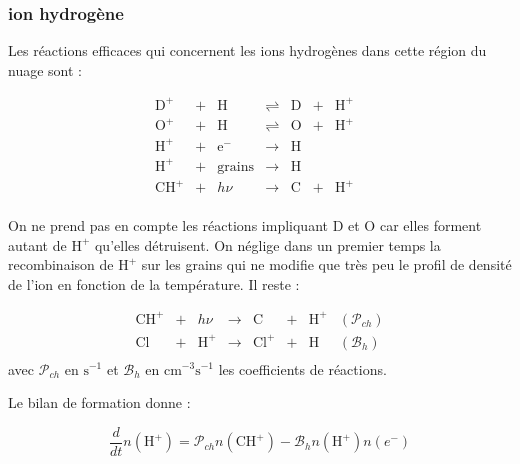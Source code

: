 \subsubsection{ion hydrogène}

Les réactions efficaces qui concernent les ions hydrogènes dans cette région du nuage sont : 

\begin{equation}\label{eq:sysH}
    \begin{array}{lllllllr}
        \mathrm{D}^+ & + &\mathrm{H}   & \rightleftharpoons &\mathrm{D}  & + & \mathrm{H}^+ &   \\
        \mathrm{O}^+ & + &\mathrm{H}   & \rightleftharpoons &\mathrm{O}  & + & \mathrm{H}^+ &   \\
        \mathrm{H}^+  & + & \mathrm{e}^-  & \rightarrow &\mathrm{H}   &   &  &  \\
        \mathrm{H}^+  & + & \mathrm{grains}  & \rightarrow &\mathrm{H}   &   &  &  \\
        \mathrm{CH}^+ & + & h\nu   & \rightarrow &\mathrm{C}  & + & \mathrm{H}^+ &  \\
    \end{array}
\end{equation}

On ne prend pas en compte les réactions impliquant $\mathrm{D}$ et $\mathrm{O}$ car elles forment autant de $\mathrm{H}^+$ qu'elles détruisent. On néglige dans un premier temps la recombinaison de $\mathrm{H}^+$ sur les grains qui ne modifie que très peu le profil de densité de l'ion en fonction de la température. Il reste :

\begin{equation}
    \begin{array}{lllllllr}
        \mathrm{CH}^+ & + & h\nu   & \rightarrow &\mathrm{C}  & + & \mathrm{H}^+ & (\mathcal{P}_{ch}) \\
        \mathrm{Cl}  & + & \mathrm{H}^+  & \rightarrow & \mathrm{Cl}^+ & + &\mathrm{H}  & (\mathcal{B}_h) \\
    \end{array}
\end{equation}
avec $\mathcal{P}_{ch}$ en $\mathrm{s}^{-1}$ et $\mathcal{B}_h$ en $\mathrm{cm}^{-3}\mathrm{s}^{-1}$ les coefficients de réactions.

Le bilan de formation donne : 

\begin{equation}
    \frac{d}{dt}n(\mathrm{H}^+) = \mathcal{P}_{ch}n(\mathrm{CH}^+) - \mathcal{B}_{h}n(\mathrm{H}^+)n(e^-)
\end{equation}

